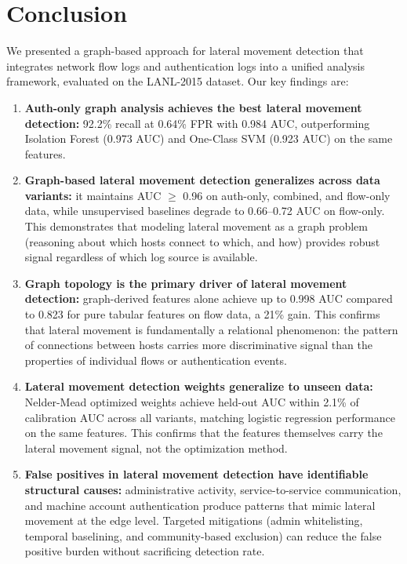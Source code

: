 \documentclass[letterpaper,twocolumn,10pt]{article}
\begin{document}
\section{Conclusion}

We presented a graph-based approach for lateral movement detection that integrates network flow logs and authentication logs into a unified analysis framework, evaluated on the LANL-2015 dataset. Our key findings are:

\begin{enumerate}
\item \textbf{Auth-only graph analysis achieves the best lateral movement detection:} 92.2\% recall at 0.64\% FPR with 0.984 AUC, outperforming Isolation Forest (0.973 AUC) and One-Class SVM (0.923 AUC) on the same features.

\item \textbf{Graph-based lateral movement detection generalizes across data variants:} it maintains AUC $\geq$ 0.96 on auth-only, combined, and flow-only data, while unsupervised baselines degrade to 0.66--0.72 AUC on flow-only. This demonstrates that modeling lateral movement as a graph problem (reasoning about which hosts connect to which, and how) provides robust signal regardless of which log source is available.

\item \textbf{Graph topology is the primary driver of lateral movement detection:} graph-derived features alone achieve up to 0.998 AUC compared to 0.823 for pure tabular features on flow data, a 21\% gain. This confirms that lateral movement is fundamentally a relational phenomenon: the pattern of connections between hosts carries more discriminative signal than the properties of individual flows or authentication events.

\item \textbf{Lateral movement detection weights generalize to unseen data:} Nelder-Mead optimized weights achieve held-out AUC within 2.1\% of calibration AUC across all variants, matching logistic regression performance on the same features. This confirms that the features themselves carry the lateral movement signal, not the optimization method.

\item \textbf{False positives in lateral movement detection have identifiable structural causes:} administrative activity, service-to-service communication, and machine account authentication produce patterns that mimic lateral movement at the edge level. Targeted mitigations (admin whitelisting, temporal baselining, and community-based exclusion) can reduce the false positive burden without sacrificing detection rate.
\end{enumerate}
\end{document}
